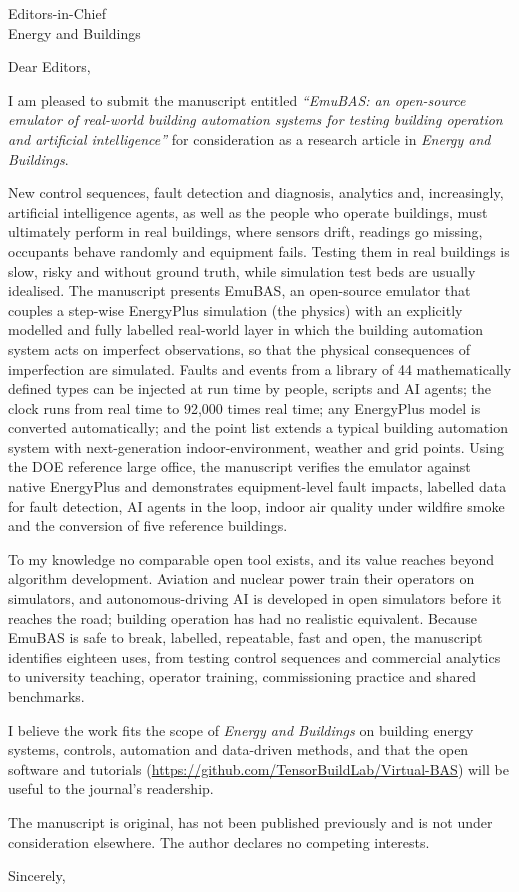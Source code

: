 \documentclass[11pt]{letter}
\begin{document}
\begin{letter}{Editors-in-Chief\\Energy and Buildings}
\opening{Dear Editors,}

I am pleased to submit the manuscript entitled \emph{``EmuBAS: an open-source emulator of real-world building
automation systems for testing building operation and artificial intelligence''} for consideration as a research
article in \emph{Energy and Buildings}.

New control sequences, fault detection and diagnosis, analytics and, increasingly, artificial intelligence agents, as
well as the people who operate buildings, must ultimately perform in real buildings, where sensors drift, readings go
missing, occupants behave randomly and equipment fails. Testing them in real buildings is slow, risky and without
ground truth, while simulation test beds are usually idealised. The manuscript presents EmuBAS, an open-source
emulator that couples a step-wise EnergyPlus simulation (the physics) with an explicitly modelled and fully labelled
real-world layer in which the building automation system acts on imperfect observations, so that the physical
consequences of imperfection are simulated. Faults and events from a library of 44 mathematically defined types can be
injected at run time by people, scripts and AI agents; the clock runs from real time to 92,000 times real time; any
EnergyPlus model is converted automatically; and the point list extends a typical building automation system with
next-generation indoor-environment, weather and grid points. Using the DOE reference large office, the manuscript
verifies the emulator against native EnergyPlus and demonstrates equipment-level fault impacts, labelled data for
fault detection, AI agents in the loop, indoor air quality under wildfire smoke and the conversion of five reference
buildings.

To my knowledge no comparable open tool exists, and its value reaches beyond algorithm development. Aviation and
nuclear power train their operators on simulators, and autonomous-driving AI is developed in open simulators before it
reaches the road; building operation has had no realistic equivalent. Because EmuBAS is safe to break, labelled,
repeatable, fast and open, the manuscript identifies eighteen uses, from testing control sequences and commercial
analytics to university teaching, operator training, commissioning practice and shared benchmarks.

I believe the work fits the scope of \emph{Energy and Buildings} on building energy systems, controls, automation and
data-driven methods, and that the open software and tutorials (\url{https://github.com/TensorBuildLab/Virtual-BAS})
will be useful to the journal's readership.

The manuscript is original, has not been published previously and is not under consideration elsewhere. The author
declares no competing interests.

\closing{Sincerely,}
\end{letter}
\end{document}
